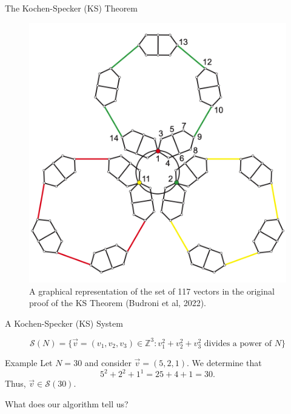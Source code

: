 \documentclass[11pt]{beamer}
\begin{document}
\begin{frame}{The Kochen-Specker (KS) Theorem}

\centering

\begin{figure}
	\includegraphics[width=0.65 \textwidth]{Kochen-Specker sets}
	
	\caption{A graphical representation of the set of 117 vectors in the original proof of the KS Theorem (Budroni et al, 2022).}
	
\end{figure}

\end{frame}

\begin{frame}{A Kochen-Specker (KS) System}

\[\mathcal{S}(N) = \{\vec{v} = (v_{1}, v_{2}, v_{3}) \in \mathbb{Z}^{3} : v_{1}^{2} + v_{2}^{2} + v_{3}^{2} \text{ divides a power of } N\}\]

\vfill
\pause

\begin{block}{Example}
	Let $N = 30$ and consider $\vec{v} = (5, 2, 1)$. We determine that
	\[5^{2} + 2^{2} + 1^{1} = 25 + 4 + 1 = 30.\]
	Thus, $\vec{v} \in \mathcal{S}(30)$.
\end{block}

\end{frame}

\begin{frame}{}
	
\centering
	\Large{What does our algorithm tell us?}
	
\end{frame}
\end{document}
